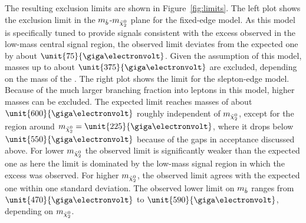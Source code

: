 The resulting exclusion limits are shown in Figure~\ref{fig:limits}. The left plot shows the exclusion limit in the $m_{\tilde{b}}$-$m_{{\tilde{\chi}^0_2}}$ plane for the fixed-edge model. As this model is specifically tuned to provide signals consistent with the excess observed in the low-mass central signal region, the observed limit deviates from the expected one by about $\unit{75}{\giga\electronvolt}$. Given the assumption of this model, \sbottom masses up to about $\unit{375}{\giga\electronvolt}$ are excluded, depending on the mass of the \secondchi. The right plot shows the limit for the slepton-edge model. Because of the much larger branching fraction into leptons in this model, higher masses can be excluded. The expected limit reaches \sbottom masses of about $\unit{600}{\giga\electronvolt}$ roughly independent of $m_{{\tilde{\chi}^0_2}}$, except for the region around $m_{\secondchi} = \unit{225}{\giga\electronvolt}$, where it drops below $\unit{550}{\giga\electronvolt}$ because of the gaps in acceptance discussed above. For lower $m_{{\tilde{\chi}^0_2}}$ the observed limit is significantly weaker than the expected one as here the limit is dominated by the low-mass signal region in which the excess was observed. For higher $m_{{\tilde{\chi}^0_2}}$, the observed limit agrees with the expected one within one standard deviation. The observed lower limit on $m_{\tilde{b}}$ ranges from $\unit{470}{\giga\electronvolt}$ to $\unit{590}{\giga\electronvolt}$, depending on $m_{{\tilde{\chi}^0_2}}$.
